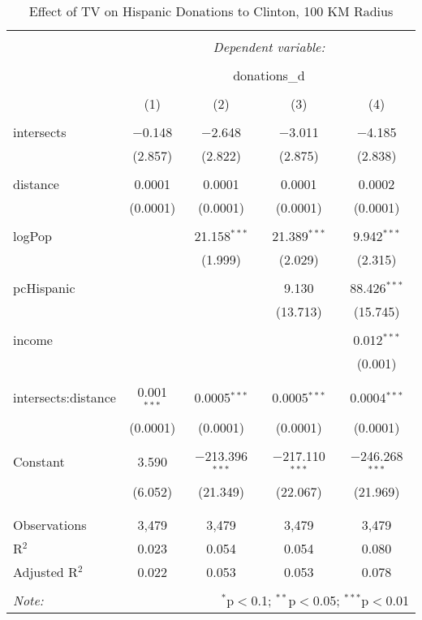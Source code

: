 
\begin{table}[!htbp] \centering 
  \caption{Effect of TV on Hispanic Donations to Clinton, 100 KM Radius} 
  \label{} 
\begin{tabular}{@{\extracolsep{-5pt}}lcccc} 
\\[-1.8ex]\hline 
\hline \\[-1.8ex] 
 & \multicolumn{4}{c}{\textit{Dependent variable:}} \\ 
\cline{2-5} 
\\[-1.8ex] & \multicolumn{4}{c}{donations\_d} \\ 
\\[-1.8ex] & (1) & (2) & (3) & (4)\\ 
\hline \\[-1.8ex] 
 intersects & $-$0.148 & $-$2.648 & $-$3.011 & $-$4.185 \\ 
  & (2.857) & (2.822) & (2.875) & (2.838) \\ 
  & & & & \\ 
 distance & 0.0001 & 0.0001 & 0.0001 & 0.0002 \\ 
  & (0.0001) & (0.0001) & (0.0001) & (0.0001) \\ 
  & & & & \\ 
 logPop &  & 21.158$^{***}$ & 21.389$^{***}$ & 9.942$^{***}$ \\ 
  &  & (1.999) & (2.029) & (2.315) \\ 
  & & & & \\ 
 pcHispanic &  &  & 9.130 & 88.426$^{***}$ \\ 
  &  &  & (13.713) & (15.745) \\ 
  & & & & \\ 
 income &  &  &  & 0.012$^{***}$ \\ 
  &  &  &  & (0.001) \\ 
  & & & & \\ 
 intersects:distance & 0.001$^{***}$ & 0.0005$^{***}$ & 0.0005$^{***}$ & 0.0004$^{***}$ \\ 
  & (0.0001) & (0.0001) & (0.0001) & (0.0001) \\ 
  & & & & \\ 
 Constant & 3.590 & $-$213.396$^{***}$ & $-$217.110$^{***}$ & $-$246.268$^{***}$ \\ 
  & (6.052) & (21.349) & (22.067) & (21.969) \\ 
  & & & & \\ 
\hline \\[-1.8ex] 
Observations & 3,479 & 3,479 & 3,479 & 3,479 \\ 
R$^{2}$ & 0.023 & 0.054 & 0.054 & 0.080 \\ 
Adjusted R$^{2}$ & 0.022 & 0.053 & 0.053 & 0.078 \\ 
\hline 
\hline \\[-1.8ex] 
\textit{Note:}  & \multicolumn{4}{r}{$^{*}$p$<$0.1; $^{**}$p$<$0.05; $^{***}$p$<$0.01} \\ 
\end{tabular} 
\end{table} 
